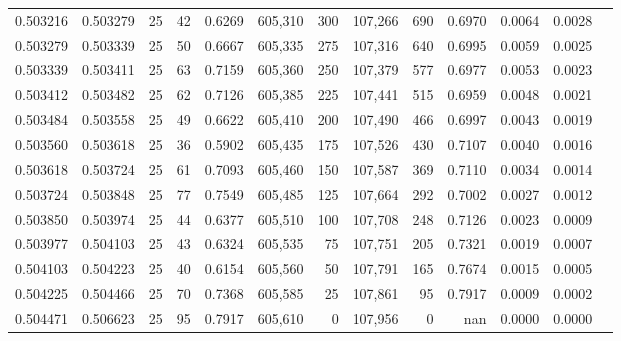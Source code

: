 \begin{tabular}{rrrrrrrrrrrrr}
0.503216 & 0.503279 &    25 &  42 &                                     0.6269 & 605,310 &     300 & 107,266 &     690 & 0.6970 & 0.0064 & 0.0028 \\
0.503279 & 0.503339 &    25 &  50 &                                     0.6667 & 605,335 &     275 & 107,316 &     640 & 0.6995 & 0.0059 & 0.0025 \\
0.503339 & 0.503411 &    25 &  63 &                                     0.7159 & 605,360 &     250 & 107,379 &     577 & 0.6977 & 0.0053 & 0.0023 \\
0.503412 & 0.503482 &    25 &  62 &                                     0.7126 & 605,385 &     225 & 107,441 &     515 & 0.6959 & 0.0048 & 0.0021 \\
0.503484 & 0.503558 &    25 &  49 &                                     0.6622 & 605,410 &     200 & 107,490 &     466 & 0.6997 & 0.0043 & 0.0019 \\
0.503560 & 0.503618 &    25 &  36 &                                     0.5902 & 605,435 &     175 & 107,526 &     430 & 0.7107 & 0.0040 & 0.0016 \\
0.503618 & 0.503724 &    25 &  61 &                                     0.7093 & 605,460 &     150 & 107,587 &     369 & 0.7110 & 0.0034 & 0.0014 \\
0.503724 & 0.503848 &    25 &  77 &                                     0.7549 & 605,485 &     125 & 107,664 &     292 & 0.7002 & 0.0027 & 0.0012 \\
0.503850 & 0.503974 &    25 &  44 &                                     0.6377 & 605,510 &     100 & 107,708 &     248 & 0.7126 & 0.0023 & 0.0009 \\
0.503977 & 0.504103 &    25 &  43 &                                     0.6324 & 605,535 &      75 & 107,751 &     205 & 0.7321 & 0.0019 & 0.0007 \\
0.504103 & 0.504223 &    25 &  40 &                                     0.6154 & 605,560 &      50 & 107,791 &     165 & 0.7674 & 0.0015 & 0.0005 \\
0.504225 & 0.504466 &    25 &  70 &                                     0.7368 & 605,585 &      25 & 107,861 &      95 & 0.7917 & 0.0009 & 0.0002 \\
0.504471 & 0.506623 &    25 &  95 &                                     0.7917 & 605,610 &       0 & 107,956 &       0 &    nan & 0.0000 & 0.0000 \\
\bottomrule
\end{tabular}

